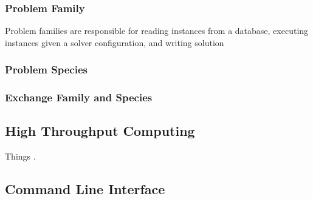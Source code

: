 \subsubsection{Problem Family}

Problem families are responsible for reading instances from a database, executing instances given a solver configuration, and writing solution 

\subsubsection{Problem Species}
 
\subsubsection{Exchange Family and Species}

\subsection{High Throughput Computing}\label{method:tools:htc}

Things \cite{bui_work_2011}.

\subsection{Command Line Interface}
